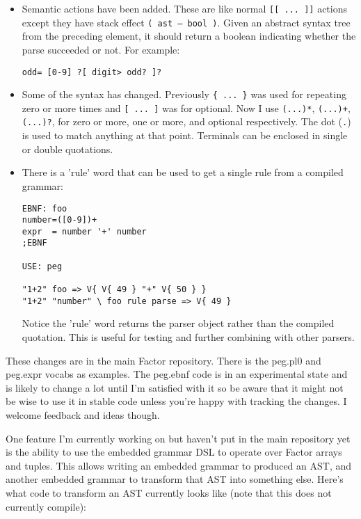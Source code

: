 \begin{itemize}
\item Semantic actions have been added. These are like normal
  \texttt{[[ ... ]]} actions except they have stack effect \texttt{(
    ast -- bool )}. Given an abstract syntax tree from the preceding
  element, it should return a boolean indicating whether the parse
  succeeded or not. For example:
\begin{verbatim}
odd= [0-9] ?[ digit> odd? ]?
\end{verbatim}

\item Some of the syntax has changed. Previously \texttt{\{ ... \}}
  was used for repeating zero or more times and \texttt{[ ... ]} was
  for optional. Now I use \texttt{(...)*}, \texttt{(...)+},
  \texttt{(...)?}, for zero or more, one or more, and optional
  respectively. The dot (\texttt{.}) is used to match anything at that
  point. Terminals can be enclosed in single or double quotations.

\item There is a 'rule' word that can be used to get a single rule
  from a compiled grammar:
\begin{verbatim}
EBNF: foo
number=([0-9])+
expr  = number '+' number
;EBNF

USE: peg

"1+2" foo => V{ V{ 49 } "+" V{ 50 } }
"1+2" "number" \ foo rule parse => V{ 49 }
\end{verbatim}

      Notice the 'rule' word returns the parser object rather than the
      compiled quotation. This is useful for testing and further
      combining with other parsers.
\end{itemize}

These changes are in the main Factor repository. There is the peg.pl0
and peg.expr vocabs as examples. The peg.ebnf code is in an
experimental state and is likely to change a lot until I'm satisfied
with it so be aware that it might not be wise to use it in stable code
unless you're happy with tracking the changes. I welcome feedback and
ideas though.

One feature I'm currently working on but haven't put in the main
repository yet is the ability to use the embedded grammar DSL to
operate over Factor arrays and tuples. This allows writing an embedded
grammar to produced an AST, and another embedded grammar to transform
that AST into something else. Here's what code to transform an AST
currently looks like (note that this does not currently compile):

